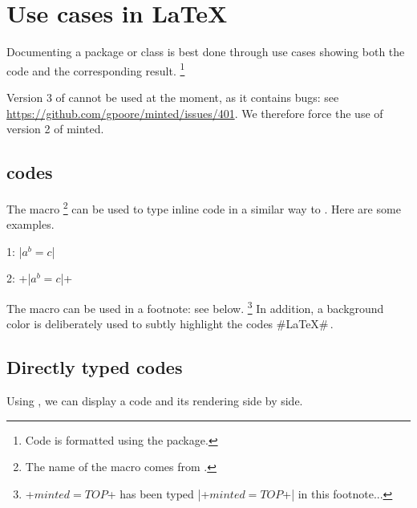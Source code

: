 \section{Use cases in \LaTeX}

Documenting a package or class is best done through use cases showing both the code and the corresponding result.
\footnote{
	Code is formatted using the  package.
}


\begin{tdoccaut}
	Version 3 of  cannot be used at the moment, as it contains bugs: see \url{https://github.com/gpoore/minted/issues/401}. We therefore force the use of version 2 of minted.

\end{tdoccaut}


\subsection{ codes} \label{tdoc-listing-inline}

The  macro
\footnote{
    The name of the macro  comes from .
}
can be used to type inline code in a similar way to .
Here are some examples.


\begin{tdoclatex}[sbs]
    1: \tdocinlatex|$a^b = c$|

    2: \tdocinlatex+\tdocinlatex|$a^b = c$|+
\end{tdoclatex}


\begin{tdocnote}
    The  macro can be used in a footnote: see below.
    \footnote{
        \tdocinlatex+$minted = TOP$+ has been typed \tdocinlatex|\tdocinlatex+$minted = TOP$+| in this footnote...
    }
    In addition, a background color is deliberately used to subtly highlight the codes \tdocinlatex#\LaTeX#\,.
\end{tdocnote}




\subsection{Directly typed codes}

\begin{tdocexa}
    Using , we can display a code and its rendering side by side.

\end{tdocexa}


